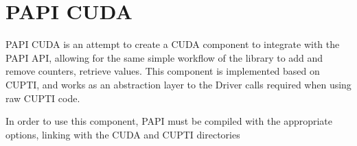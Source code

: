 \section{PAPI CUDA}
\label{sec:papi-cuda}


PAPI CUDA is an attempt to create a CUDA component to integrate with the PAPI API, allowing for the same simple workflow of the library to add and remove counters, retrieve values. This component is implemented based on CUPTI, and works as an abstraction layer to the Driver calls required when using raw CUPTI code.

In order to use this component, PAPI must be compiled with the appropriate options, linking with the CUDA and CUPTI directories